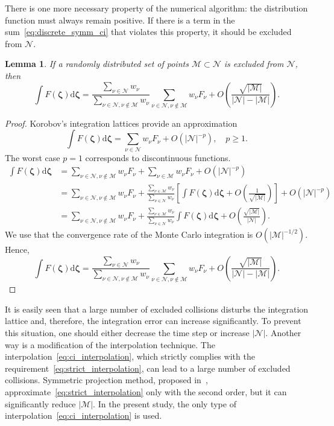 \documentclass[review]{elsarticle}
\newtheorem{lemma}{Lemma}
\newcommand{\dd}{\mathrm{d}}
\newcommand{\dzeta}{\boldsymbol{\dd\zeta}}
\newcommand{\bzeta}{\boldsymbol{\zeta}}
\newcommand{\Nu}{\mathcal{N}}
\newcommand{\Mu}{\mathcal{M}}
\newcommand{\OO}[1]{O\left(#1\right)}
\begin{document}
There is one more necessary property of the numerical algorithm:
the distribution function must always remain positive.
If there is a term in the sum~\eqref{eq:discrete_symm_ci} that violates this property,
it should be excluded from \(\Nu\).
\begin{lemma}
    If a randomly distributed set of points \(\Mu\subset\Nu\) is excluded from \(\Nu\), then
    \begin{equation*}
        \int F(\bzeta) \dzeta = \frac{\sum_{\nu\in\Nu} w_\nu}{\sum_{\nu\in\Nu,\nu\notin\Mu} w_\nu}
            \sum_{\nu\in\Nu,\nu\notin\Mu} w_\nu F_\nu + \OO{\frac{\sqrt{|\Mu|}}{|\Nu|-|\Mu|}}.
    \end{equation*}
\end{lemma}

\begin{proof}

Korobov's integration lattices provide an approximation
\begin{equation*}
    \int F(\bzeta) \dzeta = \sum_{\nu\in\Nu} w_\nu F_\nu + \OO{|\Nu|^{-p}}, \quad p\geq1.
\end{equation*}
The worst case \(p=1\) corresponds to discontinuous functions.
\begin{align*}
    \int F(\bzeta) \dzeta &= \sum_{\nu\in\Nu,\nu\notin\Mu} w_\nu F_\nu
        + \sum_{\nu\in\Mu} w_\nu F_\nu + \OO{|\Nu|^{-p}} \\
    &= \sum_{\nu\in\Nu,\nu\notin\Mu} w_\nu F_\nu
        + \frac{\sum_{\nu\in\Mu} w_\nu}{\sum_{\nu\in\Nu} w_\nu}
             \left[ \int F(\bzeta) \dzeta + \OO{\frac1{\sqrt{|\Mu|}}} \right]
        + \OO{|\Nu|^{-p}} \\
    &= \sum_{\nu\in\Nu,\nu\notin\Mu} w_\nu F_\nu
        + \frac{\sum_{\nu\in\Mu} w_\nu}{\sum_{\nu\in\Nu} w_\nu} \int F(\bzeta) \dzeta
        + \OO{\frac{\sqrt{|\Mu|}}{|\Nu|}}.
\end{align*}
We use that the convergence rate of the Monte Carlo integration is \(\OO{|\Mu|^{-1/2}}\). Hence,
\begin{equation*}
    \int F(\bzeta) \dzeta = \frac{\sum_{\nu\in\Nu} w_\nu}{\sum_{\nu\in\Nu,\nu\notin\Mu} w_\nu}
        \sum_{\nu\in\Nu,\nu\notin\Mu} w_\nu F_\nu + \OO{\frac{\sqrt{|\Mu|}}{|\Nu|-|\Mu|}}.
\end{equation*}

\end{proof}

It is easily seen that a large number of excluded collisions disturbs the integration lattice
and, therefore, the integration error can increase significantly.
To prevent this situation, one should either decrease the time step or increase \(|\Nu|\).
Another way is a modification of the interpolation technique.
The interpolation~\eqref{eq:ci_interpolation},
which strictly complies with the requirement~\eqref{eq:strict_interpolation},
can lead to a large number of excluded collisions.
Symmetric projection method, proposed in~\citet{Tcheremissine2015},
approximate~\eqref{eq:strict_interpolation} only with the second order,
but it can significantly reduce \(|\Mu|\).
In the present study, the only type of interpolation~\eqref{eq:ci_interpolation} is used.
\end{document}
